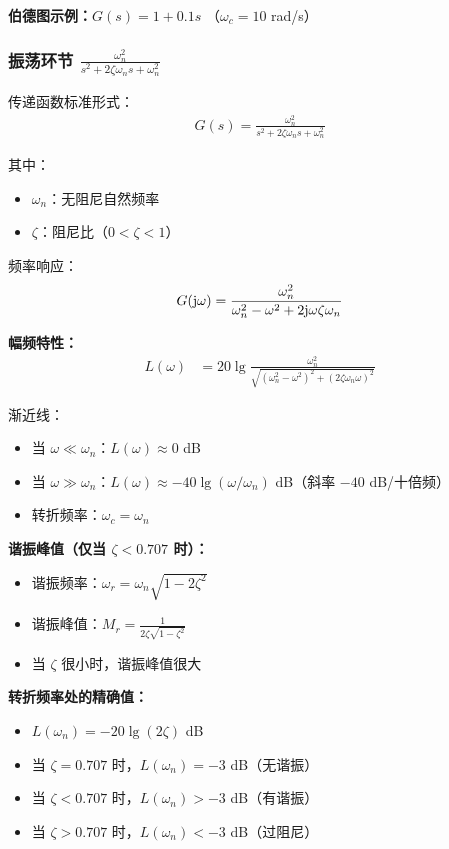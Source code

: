 \textbf{伯德图示例：}$G(s) = 1 + 0.1s$ （$\omega_c = 10$ rad/s）
\begin{center}
\end{center}

\subsubsection{振荡环节 $\frac{\omega_n^2}{s^2 + 2\zeta\omega_n s + \omega_n^2}$}
传递函数标准形式：
\begin{align*}
G(s) = \frac{\omega_n^2}{s^2 + 2\zeta\omega_n s + \omega_n^2}
\end{align*}

其中：
\begin{itemize}
    \item $\omega_n$：无阻尼自然频率
    \item $\zeta$：阻尼比（$0 < \zeta < 1$）
\end{itemize}

频率响应：
\begin{align*}
G(\mathrm{j}\omega) = \frac{\omega_n^2}{\omega_n^2 - \omega^2 + 2\mathrm{j}\omega\zeta\omega_n}
\end{align*}

\textbf{幅频特性：}
\begin{align*}
L(\omega) &= 20\lg\frac{\omega_n^2}{\sqrt{(\omega_n^2-\omega^2)^2 + (2\zeta\omega_n\omega)^2}}
\end{align*}

渐近线：
\begin{itemize}
    \item 当 $\omega \ll \omega_n$：$L(\omega) \approx 0$ dB
    \item 当 $\omega \gg \omega_n$：$L(\omega) \approx -40\lg(\omega/\omega_n)$ dB（斜率 $-40$ dB/十倍频）
    \item 转折频率：$\omega_c = \omega_n$
\end{itemize}

\textbf{谐振峰值（仅当 $\zeta < 0.707$ 时）：}
\begin{itemize}
    \item 谐振频率：$\omega_r = \omega_n\sqrt{1-2\zeta^2}$
    \item 谐振峰值：$M_r = \frac{1}{2\zeta\sqrt{1-\zeta^2}}$
    \item 当 $\zeta$ 很小时，谐振峰值很大
\end{itemize}

\textbf{转折频率处的精确值：}
\begin{itemize}
    \item $L(\omega_n) = -20\lg(2\zeta)$ dB
    \item 当 $\zeta = 0.707$ 时，$L(\omega_n) = -3$ dB（无谐振）
    \item 当 $\zeta < 0.707$ 时，$L(\omega_n) > -3$ dB（有谐振）
    \item 当 $\zeta > 0.707$ 时，$L(\omega_n) < -3$ dB（过阻尼）
\end{itemize}

